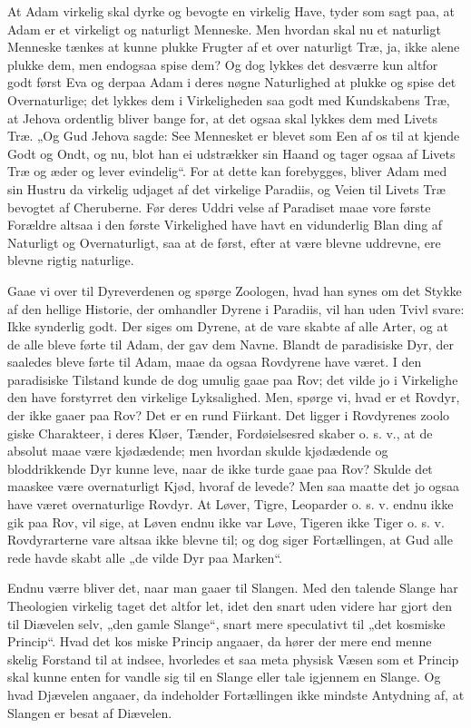 \documentclass[12pt]{book}
\newcommand{\opage}[1]{\marginnote{\footnotesize\textit{[#1]}}}
\begin{document}
At Adam virkelig skal dyrke og bevogte en virkelig
\opage{161}\setcounter{footnote}{0}%
Have, tyder som sagt paa, at Adam er et virkeligt og
naturligt Menneske. Men hvordan skal nu et naturligt
Menneske tænkes at kunne plukke Frugter af et over\-%
naturligt Træ, ja, ikke alene plukke dem, men endogsaa
spise dem? Og dog lykkes det desværre kun altfor godt
først Eva og derpaa Adam i deres nøgne Naturlighed
at plukke og spise det Overnaturlige; det lykkes
dem i Virkeligheden saa godt med Kundskabens Træ,
at Jehova ordentlig bliver bange for, at det ogsaa skal
lykkes dem med Livets Træ. „Og Gud Jehova sagde:
See Mennesket er blevet som Een af os til at kjende
Godt og Ondt, og nu, blot han ei udstrækker sin Haand
og tager ogsaa af Livets Træ og æder og lever evindelig“.
For at dette kan forebygges, bliver Adam med sin Hustru da
virkelig udjaget af det virkelige Paradiis, og Veien til
Livets Træ bevogtet af Cheruberne. Før deres Uddri\-%
velse af Paradiset maae vore første Forældre altsaa i
den første Virkelighed have havt en vidunderlig Blan\-%
ding af Naturligt og Overnaturligt, saa at de først, efter
at være blevne uddrevne, ere blevne rigtig naturlige.

Gaae vi over til Dyreverdenen og spørge Zoologen,
hvad han synes om det Stykke af den hellige Historie,
der omhandler Dyrene i Paradiis, vil han uden Tvivl
svare: Ikke synderlig godt. Der siges om Dyrene, at
de vare skabte af alle Arter, og at de alle bleve førte
til Adam, der gav dem Navne. Blandt de paradisiske
Dyr, der saaledes bleve førte til Adam, maae da ogsaa
Rovdyrene have været. I den paradisiske Tilstand kunde
de dog umulig gaae paa Rov; det vilde jo i Virkelighe\-%
den have forstyrret den virkelige Lyksalighed. Men,
spørge vi, hvad er et Rovdyr, der ikke gaaer paa Rov?
Det er en rund Fiirkant. Det ligger i Rovdyrenes zoolo\-%
giske Charakteer, i deres Kløer, Tænder, Fordøielsesred\-%
skaber o. s. v., at de absolut maae være kjødædende; men
\opage{162}\setcounter{footnote}{0}%
hvordan skulde kjødædende og bloddrikkende Dyr kunne
leve, naar de ikke turde gaae paa Rov? Skulde det
maaskee være overnaturligt Kjød, hvoraf de levede?
Men saa maatte det jo ogsaa have været overnaturlige
Rovdyr. At Løver, Tigre, Leoparder o. s. v. endnu ikke
gik paa Rov, vil sige, at Løven endnu ikke var Løve,
Tigeren ikke Tiger o. s. v. Rovdyrarterne vare altsaa
ikke blevne til; og dog siger Fortællingen, at Gud alle\-%
rede havde skabt alle „de vilde Dyr paa Marken“.

Endnu værre bliver det, naar man gaaer til Slangen.
Med den talende Slange har Theologien virkelig taget
det altfor let, idet den snart uden videre har gjort
den til Diævelen selv, „den gamle Slange“, snart mere
speculativt til „det kosmiske Princip“. Hvad det kos\-%
miske Princip angaaer, da hører der mere end menne\-%
skelig Forstand til at indsee, hvorledes et saa meta\-%
physisk Væsen som et Princip skal kunne enten for\-%
vandle sig til en Slange eller tale igjennem en Slange.
Og hvad Djævelen angaaer, da indeholder Fortællingen
ikke mindste Antydning af, at Slangen er besat af
Diævelen.
\end{document}
